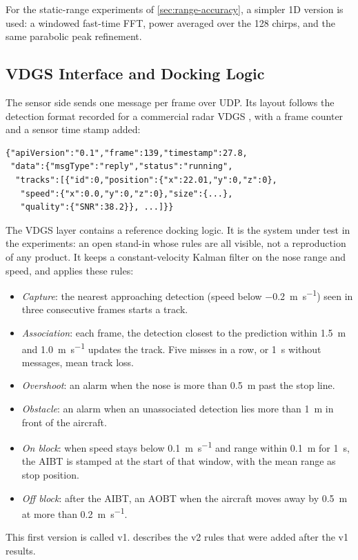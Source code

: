 \documentclass[conference]{IEEEtran}
\begin{document}
For the static-range experiments of \cref{sec:range-accuracy}, a simpler 1D version is used: a windowed fast-time FFT, power averaged over the 128 chirps, and the same parabolic peak refinement.

\subsection{VDGS Interface and Docking Logic}
\label{sec:logic}
The sensor side sends one message per frame over UDP. Its layout follows the detection format recorded for a commercial radar VDGS \cite{khalil2020radar}, with a frame counter and a sensor time stamp added:
\begin{lstlisting}
{"apiVersion":"0.1","frame":139,"timestamp":27.8,
 "data":{"msgType":"reply","status":"running",
  "tracks":[{"id":0,"position":{"x":22.01,"y":0,"z":0},
   "speed":{"x":0.0,"y":0,"z":0},"size":{...},
   "quality":{"SNR":38.2}}, ...]}}
\end{lstlisting}

The VDGS layer contains a reference docking logic. It is the system under test in the experiments: an open stand-in whose rules are all visible, not a reproduction of any product. It keeps a constant-velocity Kalman filter \cite{barshalom2001estimation} on the nose range and speed, and applies these rules:
\begin{itemize}
  \item \emph{Capture}: the nearest approaching detection (speed below \SI{-0.2}{\metre\per\second}) seen in three consecutive frames starts a track.
  \item \emph{Association}: each frame, the detection closest to the prediction within \SI{1.5}{\metre} and \SI{1.0}{\metre\per\second} updates the track. Five misses in a row, or \SI{1}{\second} without messages, mean track loss.
  \item \emph{Overshoot}: an alarm when the nose is more than \SI{0.5}{\metre} past the stop line.
  \item \emph{Obstacle}: an alarm when an unassociated detection lies more than \SI{1}{\metre} in front of the aircraft.
  \item \emph{On block}: when speed stays below \SI{0.1}{\metre\per\second} and range within \SI{0.1}{\metre} for \SI{1}{\second}, the AIBT is stamped at the start of that window, with the mean range as stop position.
  \item \emph{Off block}: after the AIBT, an AOBT when the aircraft moves away by \SI{0.5}{\metre} at more than \SI{0.2}{\metre\per\second}.
\end{itemize}
This first version is called v1.  describes the v2 rules that were added after the v1 results.
\end{document}
